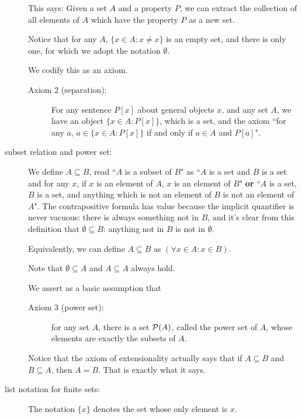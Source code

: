 \documentclass[12pt]{article}
\begin{document}
\begin{description}
This says:  Given a set $A$ and a property $P$, we can extract the collection of all elements of $A$ which have the property $P$ as a new set.

Notice that for any $A$, $\{x \in A:x \neq x\}$ is an empty set, and there is only one, for which we adopt the notation $\emptyset$.

We codify this as an axiom.

\begin{description}

\item[Axiom 2 (separation):]  For any sentence $P[x]$ about general objects $x$, and any set $A$, we have
an object $\{x \in A:P[x]\}$, which is a set, and the axiom ``for any $a$, $a \in \{x \in A:P[x]\}$ if and only if $a \in A$ and $P[a]$".

\end{description}

\item[subset relation and power set:]  We define $A \subseteq B$, read ``$A$ is a subset of $B$" as  ``$A$ is a set and $B$ is a set and for any $x$, if $x$ is an element of $A$, $x$ is an element of $B$" {\bf or}  ``$A$ is a set, $B$ is a set, and anything which is not an element of $B$ is not an element of $A$".  The contrapositive formula has value because the implicit quantifier is never vacuous:  there is always something not in $B$, and it's clear from this definition that $\emptyset \subseteq B$:  anything not in $B$ is not in $\emptyset$.

Equivalently, we can define $A \subseteq B$ as $(\forall x \in A: x\in B)$.

Note that $\emptyset \subseteq A$ and $A \subseteq A$ always hold.

We assert as a basic assumption that 

\begin{description}

\item[Axiom 3 (power set):]  for any set $A$, there is a set ${\cal P}(A)$, called the power set of $A$, whose elements are exactly the subsets of $A$.

\end{description}

Notice that the axiom of extensionality actually says that if $A \subseteq B$ and $B \subseteq A$, then $A = B$.   That is exactly what it says.


\item[list notation for finite sets:]  The notation $\{x\}$ denotes the set whose only element is $x$.


\end{description}
\end{document}
